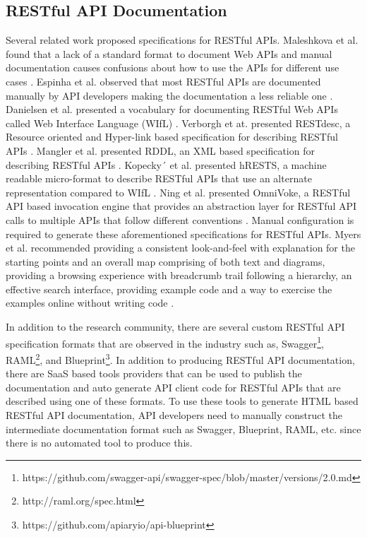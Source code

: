 \documentclass[conference]{IEEEtran}
\begin{document}
\subsection{RESTful API Documentation} %
\label{sub:restful_api_documentation}

Several related work proposed specifications for RESTful APIs. Maleshkova et al. found that a lack of a standard format to document Web APIs and manual documentation causes confusions about how to use the APIs for different use cases \cite{Maleshkova_investigating}. Espinha et al. observed that most RESTful APIs are documented manually by API developers making the documentation a less reliable one \cite{Espinha_web}. Danielsen et al. presented a vocabulary for documenting RESTful Web APIs called Web Interface Language (WIfL) \cite{Danielsen_validation}. Verborgh et at. presented RESTdesc, a Resource oriented and Hyper-link based specification for describing RESTful APIs \cite{Verborgh_functional}. Mangler et al. presented RDDL, an XML based specification for describing RESTful APIs \cite{Mangler_rddl}. Kopecky´ et al. presented hRESTS, a machine readable micro-format to describe RESTful APIs that use an alternate representation compared to WIfL \cite{Kopecky_hrests}. Ning et al. presented OmniVoke, a RESTful API based invocation engine that provides an abstraction layer for RESTful API calls to multiple APIs that follow different conventions \cite{Ning_omnivoke}. Manual configuration is required to generate these aforementioned specifications for RESTful APIs. Myers et al. recommended providing a consistent look-and-feel with explanation for the starting points and an overall map comprising of both text and diagrams, providing a browsing experience with breadcrumb trail following a hierarchy, an effective search interface, providing example code and a way to exercise the examples online without writing code \cite{Myers_study}.

In addition to the research community, there are several custom RESTful API specification formats that are observed in the industry such as, Swagger\footnote{https://github.com/swagger-api/swagger-spec/blob/master/versions/2.0.md}, RAML\footnote{http://raml.org/spec.html}, and Blueprint\footnote{https://github.com/apiaryio/api-blueprint}. In addition to producing RESTful API documentation, there are SaaS based tools providers that can be used to publish the documentation and auto generate API client code for RESTful APIs that are described using one of these formats. To use these tools to generate HTML based RESTful API documentation, API developers need to manually construct the intermediate documentation format such as Swagger, Blueprint, RAML, etc. since there is no automated tool to produce this.
\end{document}

